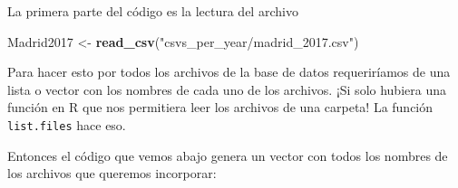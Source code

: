 \documentclass[]{book}
\newenvironment{Shaded}{\begin{snugshade}}{\end{snugshade}}
\newcommand{\DataTypeTok}[1]{\textcolor[rgb]{0.13,0.29,0.53}{#1}}
\newcommand{\DecValTok}[1]{\textcolor[rgb]{0.00,0.00,0.81}{#1}}
\newcommand{\KeywordTok}[1]{\textcolor[rgb]{0.13,0.29,0.53}{\textbf{#1}}}
\newcommand{\NormalTok}[1]{#1}
\newcommand{\OperatorTok}[1]{\textcolor[rgb]{0.81,0.36,0.00}{\textbf{#1}}}
\newcommand{\OtherTok}[1]{\textcolor[rgb]{0.56,0.35,0.01}{#1}}
\newcommand{\StringTok}[1]{\textcolor[rgb]{0.31,0.60,0.02}{#1}}
\begin{document}
\begin{Shaded}
\end{Shaded}

La primera parte del código es la lectura del archivo

\begin{Shaded}
\begin{Highlighting}[]
\NormalTok{Madrid2017 <-}\StringTok{ }\KeywordTok{read_csv}\NormalTok{(}\StringTok{"csvs_per_year/madrid_2017.csv"}\NormalTok{)}
\end{Highlighting}
\end{Shaded}

Para hacer esto por todos los archivos de la base de datos requeriríamos
de una lista o vector con los nombres de cada uno de los archivos. ¡Si
solo hubiera una función en R que nos permitiera leer los archivos de
una carpeta! La función \texttt{list.files} hace eso.

Entonces el código que vemos abajo genera un vector con todos los
nombres de los archivos que queremos incorporar:
\end{document}
